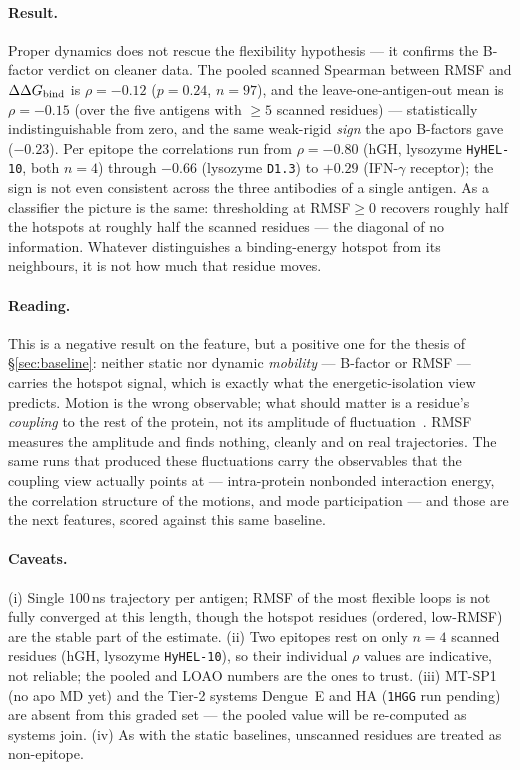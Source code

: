 \paragraph{Result.} Proper dynamics does not rescue the flexibility hypothesis --- it confirms the
B-factor verdict on cleaner data. The pooled scanned Spearman between RMSF and $\Delta\Delta G_{\mathrm{bind}}$ is
$\rho = -0.12$ ($p=0.24$, $n=97$), and the leave-one-antigen-out mean is $\rho = -0.15$ (over the five
antigens with $\geq 5$ scanned residues) --- statistically indistinguishable from zero, and the same
weak-rigid \emph{sign} the apo B-factors gave ($-0.23$). Per epitope the correlations run from
$\rho=-0.80$ (hGH, lysozyme \texttt{HyHEL-10}, both $n=4$) through $-0.66$ (lysozyme \texttt{D1.3}) to
$+0.29$ (IFN-$\gamma$ receptor); the sign is not even consistent across the three antibodies of a single
antigen. As a classifier the picture is the same: thresholding at RMSF$\geq 0$ recovers roughly half the
hotspots at roughly half the scanned residues --- the diagonal of no information. Whatever distinguishes
a binding-energy hotspot from its neighbours, it is not how much that residue moves.

\paragraph{Reading.} This is a negative result on the feature, but a positive one for the thesis of
\S\ref{sec:baseline}: neither static nor dynamic \emph{mobility} --- B-factor or RMSF --- carries the
hotspot signal, which is exactly what the energetic-isolation view predicts. Motion is the wrong
observable; what should matter is a residue's \emph{coupling} to the rest of the protein, not its
amplitude of fluctuation~\cite{serapian2020}. RMSF measures the amplitude and finds nothing, cleanly
and on real trajectories. The same runs that produced these fluctuations carry the observables that
the coupling view actually points at --- intra-protein nonbonded interaction energy, the
correlation structure of the motions, and mode participation --- and those are the next features, scored
against this same baseline.

\paragraph{Caveats.} (i) Single $100$\,ns trajectory per antigen; RMSF of the most flexible loops is
not fully converged at this length, though the hotspot residues (ordered, low-RMSF) are the stable part
of the estimate. (ii) Two epitopes rest on only $n=4$ scanned residues (hGH, lysozyme \texttt{HyHEL-10}),
so their individual $\rho$ values are indicative, not reliable; the pooled and LOAO numbers are the ones
to trust. (iii) MT-SP1 (no apo MD yet) and the Tier-2 systems Dengue~E and HA (\texttt{1HGG} run pending)
are absent from this graded set --- the pooled value will be re-computed as systems join. (iv) As with the static baselines, unscanned residues are treated as non-epitope.
